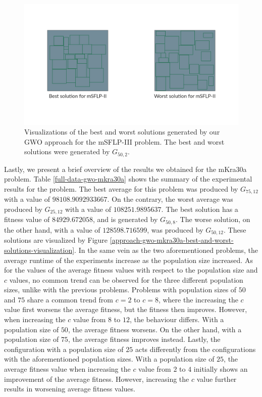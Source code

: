 \begin{figure}[h!]
\centering
\begin{adjustwidth}{-0.45in}{}
	\includegraphics[scale=1.0]{./images/chap07-rd/gwo-msflp-iii-best-and-worst-solutions.png}
\end{adjustwidth}
\caption{Visualizations of the best and worst solutions generated by our GWO approach for the mSFLP-III problem. The best and worst solutions were generated by $G_{50,2}$.}
\label{approach-gwo-msflp-iii-best-and-worst-solutions-visualization}
\end{figure}

Lastly, we present a brief overview of the results we obtained for the mKra30a problem. Table \ref{full-data-gwo-mkra30a} shows the summary of the experimental results for the problem. The best average for this problem was produced by $G_{75,12}$ with a value of $98108.9092933667$. On the contrary, the worst average was produced by $G_{25,12}$ with a value of $108251.9895637$. The best solution has a fitness value of $84929.672058$, and is generated by $G_{50,8}$. The worse solution, on the other hand, with a value of $128598.716599$, was produced by $G_{50,12}$. These solutions are visualized by Figure \ref{approach-gwo-mkra30a-best-and-worst-solutions-visualization}. In the same vein as the two aforementioned problems, the average runtime of the experiments increase as the population size increased. As for the values of the average fitness values with respect to the population size and $c$ values, no common trend can be observed for the three different population sizes, unlike with the previous problems. Problems with population sizes of $50$ and $75$ share a common trend from $c = 2$ to $c = 8$, where the increasing the $c$ value first worsens the average fitness, but the fitness then improves. However, when increasing the $c$ value from $8$ to $12$, the behaviour differs. With a population size of $50$, the average fitness worsens. On the other hand, with a population size of $75$, the average fitness improves instead. Lastly, the configuration with a population size of $25$ acts differently from the configurations with the aforementioned population sizes. With a population size of $25$, the average fitness value when increasing the $c$ value from $2$ to $4$ initially shows an improvement of the average fitness. However, increasing the $c$ value further results in worsening average fitness values.

